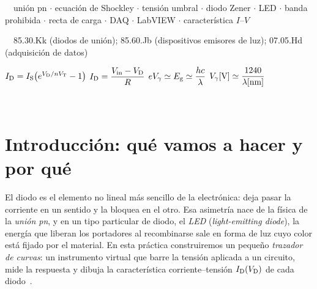 \documentclass[11pt,a4paper]{article}
\begin{document}
\ \
unión pn $\cdot$ ecuación de Shockley $\cdot$ tensión umbral $\cdot$ diodo
Zener $\cdot$ LED $\cdot$ banda prohibida $\cdot$ recta de carga $\cdot$ DAQ
$\cdot$ LabVIEW $\cdot$ característica $I$--$V$
\par\vspace{5pt}
\ \ 85.30.Kk
(diodos de unión); 85.60.Jb (dispositivos emisores de luz); 07.05.Hd
(adquisición de datos)
\par{}\vspace{9pt}
\noindent\hfill
$\ID=\IS\bigl(e^{\VD/n\VT}-1\bigr)$\hfill
$\ID=\dfrac{\Vin-\VD}{R}$\hfill
$e\Vg\simeq\Eg\simeq\dfrac{hc}{\lambda}$\hfill
$\Vg[\si{V}]\simeq\dfrac{1240}{\lambda[\si{nm}]}$\hfill\null
\par{}

\vfill
\begin{center}
  {\color{navy}\large{}}\\[6pt]
  {\color{grisazul}\textls[120]{\textsc{Salamanca, curso 2026/2027}}}
\end{center}
\vspace*{0.2cm}
\newpage

\pagestyle{plain}
\renewcommand{\contentsname}{Índice}
{\hypersetup{linkcolor=black}\tableofcontents}
\newpage
\pagestyle{fancy}

\section{Introducción: qué vamos a hacer y por qué}

El diodo es el elemento no lineal más sencillo de la electrónica: deja pasar
la corriente en un sentido y la bloquea en el otro. Esa asimetría nace de la
física de la \emph{unión pn}, y en un tipo particular de diodo, el \emph{LED}
(\emph{light-emitting diode}), la energía que liberan los portadores al
recombinarse sale en forma de luz cuyo color está fijado por el material. En
esta práctica construiremos un pequeño \emph{trazador de curvas}: un
instrumento virtual que barre la tensión aplicada a un circuito, mide la
respuesta y dibuja la característica corriente--tensión $\ID(\VD)$ de cada
diodo~\cite{guion}.
\end{document}
